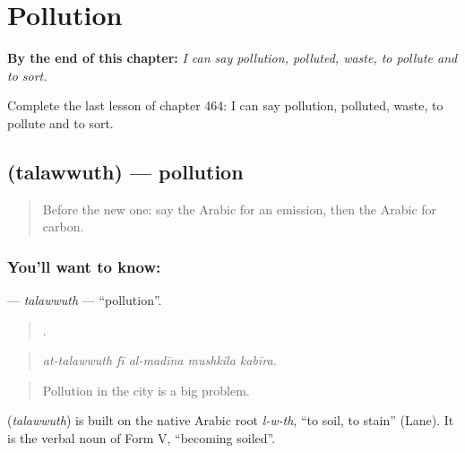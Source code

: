 
\chapter{Pollution}
\label{ch:ar-pollution}

\begin{chapteropening}
\textbf{By the end of this chapter:} \emph{I can say pollution, polluted, waste, to pollute and to sort.}

Complete the last lesson of chapter 464: I can say pollution, polluted, waste, to pollute and to sort.
\end{chapteropening}

\section[\texorpdfstring{\ar{تلوث} (talawwuth)}{تلوث (talawwuth)}]{ (talawwuth) — pollution}

\label{lesson:AR-C464-talawwuth}



\begin{quote}
Before the new one: say the Arabic for an emission, then the Arabic for carbon.
\end{quote}

\subsection*{You'll want to know: }
\textbf{} — \emph{talawwuth} — \textquotedblleft{}pollution\textquotedblright{}.

\begin{quote}
    .
\end{quote}

\begin{quote}
\emph{at-talawwuth fī al-madīna mushkila kabīra.}
\end{quote}

\begin{quote}
Pollution in the city is a big problem.
\end{quote}

\begin{cousinweb}
\textbf{} (\emph{talawwuth}) is built on the native Arabic root \emph{l-w-th}, \textquotedblleft{}to soil, to stain\textquotedblright{} (Lane). It is the verbal noun of Form V, \textquotedblleft{}becoming soiled\textquotedblright{}.
\end{cousinweb}

